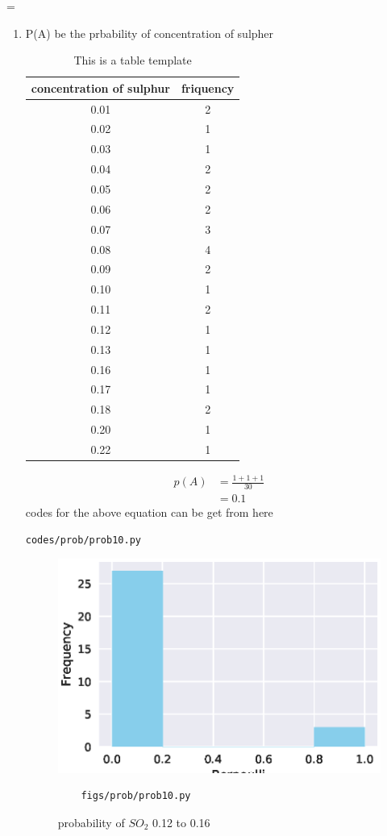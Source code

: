 =\renewcommand{\theequation}{\theenumi}
\begin{enumerate}[label=\arabic*.,ref=\thesubsection.\theenumi]
\item P(A) be the prbability of concentration of sulpher

\begin{table}[!ht]
\begin{tabular}{ |c|c| } 
	\hline
	\textbf{concentration of sulphur} &\textbf{friquency}\\
	\hline
	0.01 &2\\ 
	0.02 &1\\ 
	0.03 &1\\ 
	0.04 &2\\ 
	0.05 &2\\ 
	0.06 &2\\ 
	0.07 &3\\
	0.08 &4\\ 
	0.09 &2\\ 
	0.10 &1\\ 
	0.11 &2\\ 
	0.12 &1\\ 
	0.13 &1\\ 
	0.16 &1\\ 
	0.17 &1\\ 
	0.18 &2\\ 
	0.20 &1\\ 
	0.22 &1\\   
	\hline
\end{tabular}	
	\caption{This is a table template}
	\label{tab:template}
\end{table}
\begin{align}
p\left(A\right) &= \frac{1+1+1}{30}
\\
&= 0.1
\end{align}
codes for the above equation can be get from here
\begin{lstlisting}
codes/prob/prob10.py
\end{lstlisting}
\begin{figure}[!ht]
	\centering
	\includegraphics[width=\columnwidth]{./figures/prob/prob10.eps}
	\caption{probability of $SO_2$ 0.12 to 0.16 }
	\label{fig:bt9}
	\begin{lstlisting}
	figs/prob/prob10.py
	\end{lstlisting}
\end{figure}
\end{enumerate}